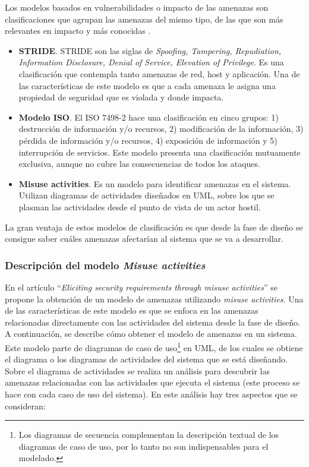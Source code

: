 Los modelos basados en vulnerabilidades o impacto de las amenazas son clasificaciones que agrupan las amenazas del mismo tipo, de las que son más relevantes en impacto y más conocidas \cite{gupta2016handbook}.

\begin{itemize}[noitemsep]
	\item \textbf{STRIDE}. STRIDE son las siglas de \textit{Spoofing, Tampering, Repudiation, Information Disclosure, Denial of Service, Elevation of Privilege}. Es una clasificación que contempla tanto amenazas de red, host y aplicación. Una de las características de este modelo es que a cada amenaza le asigna una propiedad de seguridad que es violada y donde impacta.
	\item \textbf{Modelo ISO}. El ISO 7498-2 hace una clasificación en cinco grupos: 1) destrucción de información y/o recursos, 2) modificación de la información, 3) pérdida de información y/o recursos, 4) exposición de información y 5) interrupción de servicios. Este modelo presenta una clasificación mutuamente exclusiva, aunque no cubre las consecuencias de todos los ataques. 
	\item \textbf{Misuse activities}. Es un modelo para identificar amenazas en el sistema. Utilizan diagramas de actividades diseñados en UML, sobre los que se plasman las actividades desde el punto de vista de un actor hostil.
\end{itemize}

La gran ventaja de estos modelos de clasificación es que desde la fase de diseño se consigue saber cuáles amenazas afectarían al sistema que se va a desarrollar. 

\subsubsection*{Descripción del modelo \textit{Misuse activities}}

En el artículo ``\textit{Eliciting security requirements through misuse activities}'' \cite{BraFerVan08} se propone la obtención de un modelo de amenazas utilizando \textit{misuse activities}. Una de las características de este modelo es que se enfoca en las amenazas relacionadas directamente con las actividades del sistema desde la fase de diseño. A continuación, se describe cómo obtener el modelo de amenazas en un sistema. Este modelo parte de diagramas de caso de uso\footnote{Los diagramas de secuencia complementan la descripción textual de los diagramas de caso de uso, por lo tanto no son indispensables para el modelado.} en UML, de los cuales se obtiene el diagrama o los diagramas de actividades del sistema que se está diseñando. Sobre el diagrama de actividades se realiza un análisis para descubrir las amenazas relacionadas con las actividades que ejecuta el sistema (este proceso se hace con cada caso de uso del sistema). En este análisis hay tres aspectos que se consideran:

